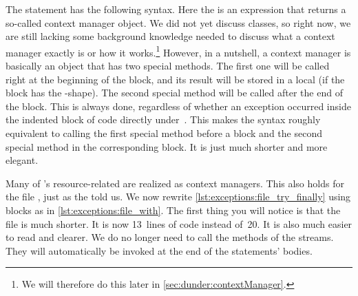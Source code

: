 %
%
The  statement has the following syntax.
Here the  is an expression that returns a so-called context manager object.
We did not yet discuss classes, so right now, we are still lacking some background knowledge needed to discuss what a context manager exactly is or how it works.\footnote{%
We will therefore do this later in \cref{sec:dunder:contextManager}.}
However, in a nutshell, a context manager is basically an object that has two special methods.
The first one will be called right at the beginning of the  block, and its result will be stored in a local  (if the  block has the -shape).
The second special method will be called after the end of the  block.
This is always done, regardless of whether an exception occurred inside the indented block of code directly under~.%
%
%
\FloatBarrier%
%
This makes the syntax roughly equivalent to calling the first special method before a  block and the second special method in the corresponding  block.
It is just much shorter and more elegant.

%
%

Many of \python's resource-related  are realized as context managers.
This also holds for the file  , just as the  told us.
We now rewrite \cref{lst:exceptions:file_try_finally} using  blocks as  in \cref{lst:exceptions:file_with}.
The first thing you will notice is that the file is much shorter.
It is now 13~lines of code instead of~20.
It is also much easier to read and clearer.
We do no longer need to call the  methods of the streams.
They will automatically be invoked at the end of the  statements' bodies.

